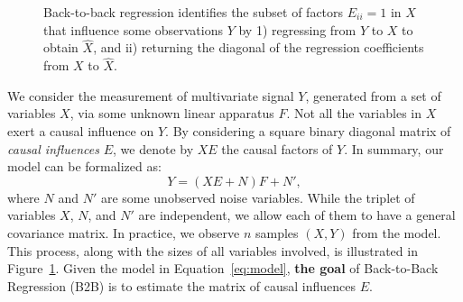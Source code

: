 \documentclass{article}
\begin{document}
\begin{figure}[t!]
    \caption{Back-to-back regression identifies the subset of factors $E_{ii} = 1$ in $X$ that influence some observations $Y$ by 1) regressing from $Y$ to $X$ to obtain $\hat{X}$, and ii) returning the diagonal of the regression coefficients from $X$ to $\hat{X}$.}
    \label{fig:b2b}
\end{figure}

We consider the measurement of multivariate signal $Y$, generated from a set of variables $X$, via some unknown linear apparatus $F$.
%
Not all the variables in $X$ exert a causal influence on $Y$.
%
By considering a square binary diagonal matrix of \emph{causal influences} $E$, we denote by $XE$ the causal factors of $Y$.
%
In summary, our model can be formalized as:
%
\begin{equation}
    Y = (XE + N)F + N',\label{eq:model}
\end{equation}
%
where $N$ and $N'$ are some unobserved noise variables.
%
While the triplet of variables $X$, $N$, and $N'$ are independent, we allow each of them to have a general covariance matrix.
%
In practice, we observe $n$ samples $(X, Y)$ from the model.
%
This process, along with the sizes of all variables involved, is illustrated in Figure~\ref{fig:b2b}.
%
Given the model in Equation~\eqref{eq:model}, \textbf{the goal} of Back-to-Back Regression (B2B) is to estimate the matrix of causal influences $E$.
\end{document}
